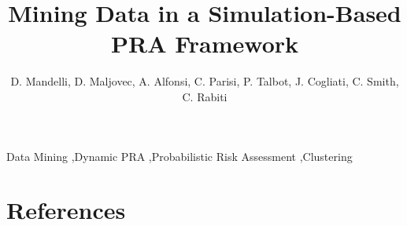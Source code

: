 \documentclass{elsarticle}
\begin{document}
\begin{frontmatter}

\title{Mining Data in a Simulation-Based PRA Framework}

\author{D. Mandelli, D. Maljovec, A. Alfonsi, C. Parisi, P. Talbot, J. Cogliati, C. Smith, C. Rabiti}
\address{Idaho National Laboratory (INL), 2525 Fremont Ave, 83402 Idaho Falls (ID), USA}

\begin{abstract}
  
\end{abstract}

\begin{keyword}
Data Mining \sep Dynamic PRA \sep Probabilistic Risk Assessment \sep Clustering 
\end{keyword}

\end{frontmatter}

\linenumbers

\printnomenclature[1in]








\section*{References}


\end{document}
